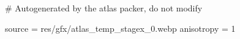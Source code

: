 # Autogenerated by the atlas packer, do not modify

source = res/gfx/atlas_temp_stagex_0.webp
anisotropy = 1